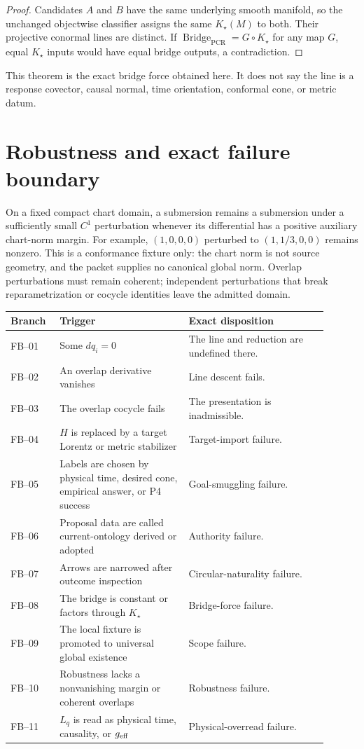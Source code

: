 \documentclass[11pt]{article}
\newcommand{\Kstar}{K_{\star}}
\newcommand{\Bridge}{\operatorname{Bridge}_{\mathrm{PCR}}}
\begin{document}
\begin{proof}
Candidates $A$ and $B$ have the same underlying smooth manifold, so the
unchanged objectwise classifier assigns the same $\Kstar(M)$ to both.  Their
projective conormal lines are distinct.  If
$\Bridge=G\circ\Kstar$ for any map $G$, equal $\Kstar$ inputs would have equal
bridge outputs, a contradiction.
\end{proof}

This theorem is the exact bridge force obtained here.  It does not say the
line is a response covector, causal normal, time orientation, conformal cone,
or metric datum.

\section{Robustness and exact failure boundary}

On a fixed compact chart domain, a submersion remains a submersion under a
sufficiently small $C^1$ perturbation whenever its differential has a positive
auxiliary chart-norm margin.  For example, $(1,0,0,0)$ perturbed to
$(1,1/3,0,0)$ remains nonzero.  This is a conformance fixture only: the chart
norm is not source geometry, and the packet supplies no canonical global norm.
Overlap perturbations must remain coherent; independent perturbations that
break reparametrization or cocycle identities leave the admitted domain.

\begin{center}
\small
\begin{tabular}{p{0.13\linewidth}p{0.37\linewidth}p{0.40\linewidth}}
\toprule
Branch & Trigger & Exact disposition \\
\midrule
FB--01 & Some $dq_i=0$ & The line and reduction are undefined there. \\
FB--02 & An overlap derivative vanishes & Line descent fails. \\
FB--03 & The overlap cocycle fails & The presentation is inadmissible. \\
FB--04 & $H$ is replaced by a target Lorentz or metric stabilizer & Target-import failure. \\
FB--05 & Labels are chosen by physical time, desired cone, empirical answer, or P4 success & Goal-smuggling failure. \\
FB--06 & Proposal data are called current-ontology derived or adopted & Authority failure. \\
FB--07 & Arrows are narrowed after outcome inspection & Circular-naturality failure. \\
FB--08 & The bridge is constant or factors through $\Kstar$ & Bridge-force failure. \\
FB--09 & The local fixture is promoted to universal global existence & Scope failure. \\
FB--10 & Robustness lacks a nonvanishing margin or coherent overlaps & Robustness failure. \\
FB--11 & $L_q$ is read as physical time, causality, or $g_{\rm eff}$ & Physical-overread failure. \\
\bottomrule
\end{tabular}
\end{center}
\end{document}
